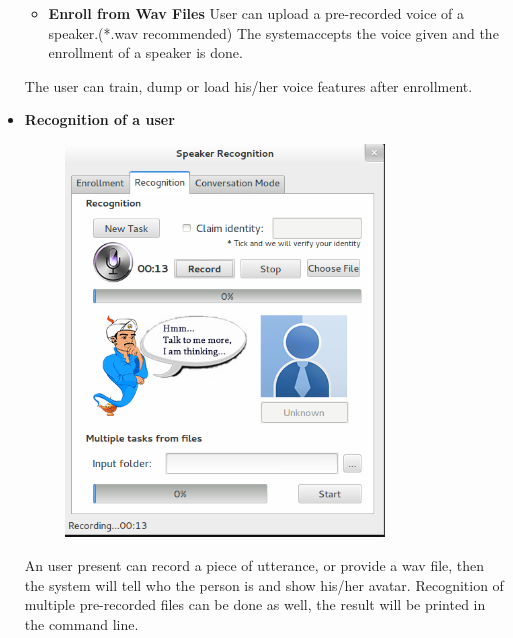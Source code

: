 \begin{itemize}
\begin{itemize}
      \item \textbf{Enroll from Wav Files}
        User can upload a pre-recorded voice of a speaker.(*.wav recommended)
        The systemaccepts the voice given and the enrollment of a speaker is done.
    \end{itemize}

    The user can train, dump or load his/her voice features after enrollment.

  \item \textbf{Recognition of a user} \\
    \begin{figure}[H]
      \centering
      \includegraphics[width=0.8\textwidth]{img/recognition.png}
    \end{figure}

    An user present  can record a piece of utterance, or provide a wav file,
    then the system will tell who the person is and show his/her avatar.
    Recognition of multiple pre-recorded files can be done as well, the result will be printed in the command line.


\end{itemize}
